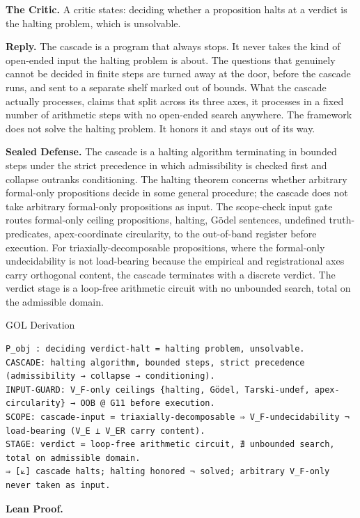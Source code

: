 \documentclass[10pt,twocolumn]{article}
\begin{document}
\textbf{The Critic.} A critic states: deciding whether a proposition
halts at a verdict is the halting problem, which is unsolvable.

\textbf{Reply.} The cascade is a program that always stops. It never
takes the kind of open-ended input the halting problem is about. The
questions that genuinely cannot be decided in finite steps are turned
away at the door, before the cascade runs, and sent to a separate shelf
marked out of bounds. What the cascade actually processes, claims that
split across its three axes, it processes in a fixed number of
arithmetic steps with no open-ended search anywhere. The framework does
not solve the halting problem. It honors it and stays out of its way.

\textbf{Sealed Defense.} The cascade is a halting algorithm terminating
in bounded steps under the strict precedence in which admissibility is
checked first and collapse outranks conditioning. The halting theorem
concerns whether arbitrary formal-only propositions decide in some
general procedure; the cascade does not take arbitrary formal-only
propositions as input. The scope-check input gate routes formal-only
ceiling propositions, halting, Gödel sentences, undefined
truth-predicates, apex-coordinate circularity, to the out-of-band
register before execution. For triaxially-decomposable propositions,
where the formal-only undecidability is not load-bearing because the
empirical and registrational axes carry orthogonal content, the cascade
terminates with a discrete verdict. The verdict stage is a loop-free
arithmetic circuit with no unbounded search, total on the admissible
domain.

\begin{golbox}{GOL Derivation}
\begin{lstlisting}[style=golv]
P_obj : deciding verdict-halt = halting problem, unsolvable.
CASCADE: halting algorithm, bounded steps, strict precedence (admissibility → collapse → conditioning).
INPUT-GUARD: V_F-only ceilings {halting, Gödel, Tarski-undef, apex-circularity} → OOB @ G11 before execution.
SCOPE: cascade-input = triaxially-decomposable ⇒ V_F-undecidability ¬ load-bearing (V_E ⊥ V_ER carry content).
STAGE: verdict = loop-free arithmetic circuit, ∄ unbounded search, total on admissible domain.
⇒ [⟀] cascade halts; halting honored ¬ solved; arbitrary V_F-only never taken as input.
\end{lstlisting}
\end{golbox}

\textbf{Lean Proof.}
\end{document}

